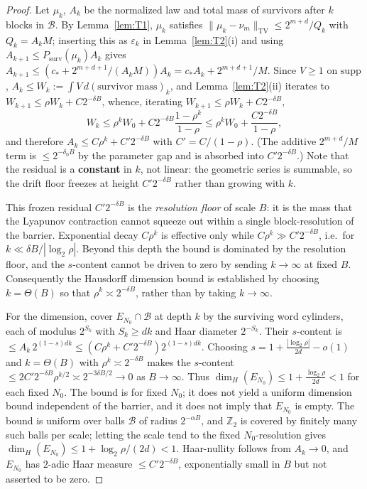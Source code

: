 \documentclass[12pt,a4paper]{article}
\begin{document}
\begin{proof}
Let $\mu_k$, $A_k$ be the normalized law and total mass of survivors after $k$
blocks in $\mathcal B$. By Lemma~\ref{lem:T1}, $\mu_k$ satisfies
$\|\mu_k-\nu_m\|_{\mathrm{TV}}\le2^{m+d}/Q_k$ with $Q_k=A_kM$; inserting this as
$\varepsilon_k$ in Lemma~\ref{lem:T2}(i) and using $A_{k+1}\le P_{\mathrm{surv}}(\mu_k)A_k$
gives $A_{k+1}\le(c_*+2^{m+d+1}/(A_kM))A_k=c_*A_k+2^{m+d+1}/M$.
Since $V\ge1$ on $\mathrm{supp}$, $A_k\le W_k:=\int V\,d(\text{survivor mass})_k$,
and Lemma~\ref{lem:T2}(ii) iterates to $W_{k+1}\le\rho W_k+C2^{-\delta B}$,
whence, iterating $W_{k+1}\le\rho W_k+C2^{-\delta B}$,
\[
W_k\le\rho^k W_0+C2^{-\delta B}\frac{1-\rho^k}{1-\rho}
\le\rho^k W_0+\frac{C2^{-\delta B}}{1-\rho},
\]
and therefore $A_k\le C\rho^k+C'2^{-\delta B}$ with $C'=C/(1-\rho)$. (The additive $2^{m+d}/M$ term is $\le2^{-\delta_0B}$ by the parameter gap and is absorbed into $C'2^{-\delta B}$.) Note that the residual is a \textbf{constant} in $k$, not linear: the geometric series is summable, so the drift floor freezes at height $C'2^{-\delta B}$ rather than growing with $k$.

This frozen residual $C'2^{-\delta B}$ is the \emph{resolution floor} of scale $B$: it is the mass that the Lyapunov contraction cannot squeeze out within a single block-resolution of the barrier. Exponential decay $C\rho^k$ is effective only while $C\rho^k\gg C'2^{-\delta B}$, i.e.\ for $k\ll\delta B/|\log_2\rho|$. Beyond this depth the bound is dominated by the resolution floor, and the $s$-content cannot be driven to zero by sending $k\to\infty$ at fixed $B$. Consequently the Hausdorff dimension bound is established by choosing $k=\Theta(B)$ so that $\rho^k\asymp2^{-\delta B}$, rather than by taking $k\to\infty$.

For the dimension, cover $E_{N_0}\cap\mathcal B$ at depth $k$ by the surviving
word cylinders, each of modulus $2^{S_k}$ with $S_k\ge dk$ and Haar diameter
$2^{-S_k}$. Their $s$-content is
$\le A_k\,2^{(1-s)dk}\le(C\rho^k+C'2^{-\delta B})2^{(1-s)dk}$.
Choosing $s=1+\frac{|\log_2\rho|}{2d}-o(1)$ and $k=\Theta(B)$ with $\rho^k\asymp2^{-\delta B}$ makes the $s$-content $\le2C'2^{-\delta B}\rho^{k/2}\asymp2^{-3\delta B/2}\to0$ as $B\to\infty$. Thus $\dim_H(E_{N_0})\le1+\frac{\log_2\rho}{2d}<1$ for each fixed $N_0$. The bound is for fixed $N_0$; it does not yield a uniform dimension bound independent of the barrier, and it does not imply that $E_{N_0}$ is empty.
The bound is uniform over balls $\mathcal B$ of radius $2^{-\alpha B}$, and
$\mathbb{Z}_2$ is covered by finitely many such balls per scale; letting the scale tend
to the fixed $N_0$-resolution gives $\dim_H(E_{N_0})\le1+\log_2\rho/(2d)<1$.
Haar-nullity follows from $A_k\to0$, and $E_{N_0}$ has $2$-adic Haar measure $\le C'2^{-\delta B}$, exponentially small in $B$ but not asserted to be zero.
\end{proof}
\end{document}
